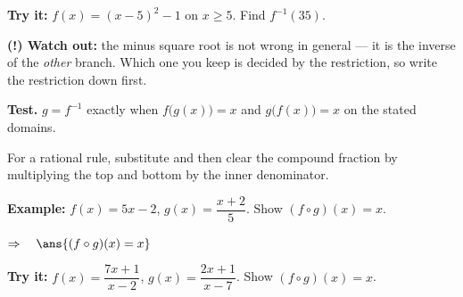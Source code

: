 \documentclass[12pt]{article}
\begin{document}
\begin{tryitbox}
\textbf{Try it:} \quad $f(x) = (x-5)^{2} - 1$ on $x \geq 5$. Find $f^{-1}(35)$.\\[2pt]
\end{tryitbox}

\begin{watchoutbox}
\textbf{(!) Watch out:} the minus square root is not wrong in general --- it is the inverse of the \emph{other} branch. Which one you keep is decided by the restriction, so write the restriction down first.
\end{watchoutbox}


\begin{formulabox}
\textbf{Test.} $g = f^{-1}$ exactly when $f\bigl(g(x)\bigr) = x$ and $g\bigl(f(x)\bigr) = x$ on the stated domains.\par
For a rational rule, substitute and then clear the compound fraction by multiplying the top and bottom by the inner denominator.
\end{formulabox}

\begin{examplebox}
\textbf{Example:} \quad $f(x) = 5x - 2$, $g(x) = \dfrac{x+2}{5}$. Show $(f \circ g)(x) = x$.

$\Rightarrow\quad \ans{(f \circ g)(x) = x}$
\end{examplebox}

\begin{tryitbox}
\textbf{Try it:} \quad $f(x) = \dfrac{7x+1}{x-2}$, $g(x) = \dfrac{2x+1}{x-7}$. Show $(f \circ g)(x) = x$.\\[2pt]
\end{tryitbox}
\end{document}
